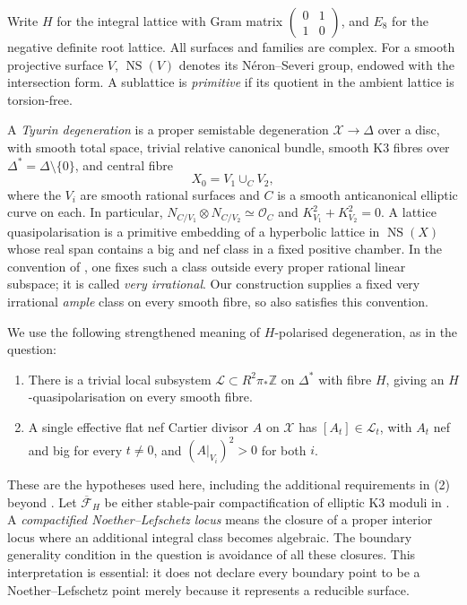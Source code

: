 \documentclass[11pt]{article}
\theoremstyle{definition}
\theoremstyle{remark}
\newcommand{\Z}{\mathbb Z}
\newcommand{\NS}{\operatorname{NS}}
\newcommand{\OO}{\mathcal O}
\begin{document}
Write $H$ for the integral lattice with Gram matrix $\left(\begin{smallmatrix}0&1\\1&0\end{smallmatrix}\right)$, and $E_8$ for the negative definite root lattice. All surfaces and families are complex. For a smooth projective surface $V$, $\NS(V)$ denotes its N\'eron--Severi group, endowed with the intersection form. A sublattice is \emph{primitive} if its quotient in the ambient lattice is torsion-free.

A \emph{Tyurin degeneration} is a proper semistable degeneration $\mathcal X\to\Delta$ over a disc, with smooth total space, trivial relative canonical bundle, smooth K3 fibres over $\Delta^*=\Delta\setminus\{0\}$, and central fibre
\[
X_0=V_1\cup_C V_2,
\]
where the $V_i$ are smooth rational surfaces and $C$ is a smooth anticanonical elliptic curve on each. In particular, $N_{C/V_1}\otimes N_{C/V_2}\simeq\OO_C$ and $K_{V_1}^2+K_{V_2}^2=0$.
A lattice quasipolarisation is a primitive embedding of a hyperbolic lattice in $\NS(X)$ whose real span contains a big and nef class in a fixed positive chamber. In the convention of \cite[\S2B]{AE}, one fixes such a class outside every proper rational linear subspace; it is called \emph{very irrational}. Our construction supplies a fixed very irrational \emph{ample} class on every smooth fibre, so also satisfies this convention.

We use the following strengthened meaning of $H$-polarised degeneration, as in the question:
\begin{enumerate}
\item There is a trivial local subsystem $\mathcal L\subset R^2\pi_*\Z$ on $\Delta^*$ with fibre $H$, giving an $H$-quasipolarisation on every smooth fibre.
\item A single effective flat nef Cartier divisor $A$ on $\mathcal X$ has $[A_t]\in\mathcal L_t$, with $A_t$ nef and big for every $t\ne0$, and $(A|_{V_i})^2>0$ for both $i$.
\end{enumerate}
These are the hypotheses used here, including the additional requirements in (2) beyond \cite[Definition~3.20]{GT}. Let $\overline{\mathcal F}_H$ be either stable-pair compactification of elliptic K3 moduli in \cite{ABE}. A \emph{compactified Noether--Lefschetz locus} means the closure of a proper interior locus where an additional integral class becomes algebraic. The boundary generality condition in the question is avoidance of all these closures. This interpretation is essential: it does not declare every boundary point to be a Noether--Lefschetz point merely because it represents a reducible surface.
\end{document}
